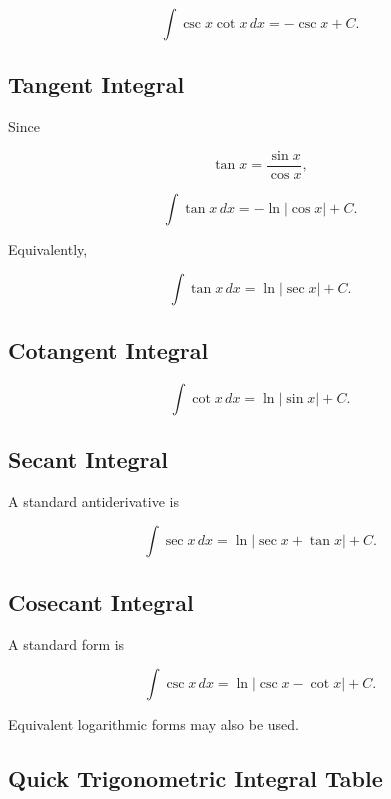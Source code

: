 \[
\boxed{
\int
\csc x\cot x
\,dx
=
-\csc x+C.
}
\]

\subsection{Tangent Integral}
\label{subsec:tangent-integral-reference}

Since

\[
\tan x
=
\frac{\sin x}{\cos x},
\]

\[
\boxed{
\int\tan x\,dx
=
-\ln|\cos x|+C.
}
\]

Equivalently,

\[
\boxed{
\int\tan x\,dx
=
\ln|\sec x|+C.
}
\]

\subsection{Cotangent Integral}
\label{subsec:cotangent-integral-reference}

\[
\boxed{
\int\cot x\,dx
=
\ln|\sin x|+C.
}
\]

\subsection{Secant Integral}
\label{subsec:secant-integral-reference}

A standard antiderivative is

\[
\boxed{
\int\sec x\,dx
=
\ln|\sec x+\tan x|+C.
}
\]

\subsection{Cosecant Integral}
\label{subsec:cosecant-integral-reference}

A standard form is

\[
\boxed{
\int\csc x\,dx
=
\ln|\csc x-\cot x|+C.
}
\]

Equivalent logarithmic forms may also be used.

\subsection{Quick Trigonometric Integral Table}
\label{subsec:quick-trig-integral-table}

